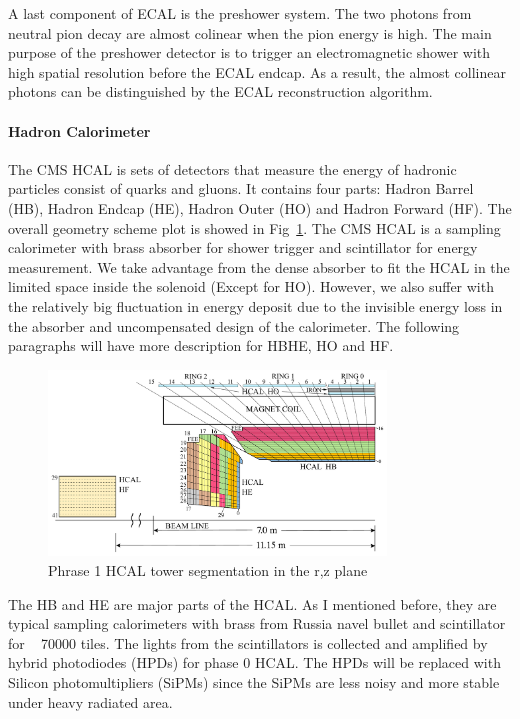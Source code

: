 A last component of ECAL is the preshower system. The two photons from neutral pion decay are almost colinear when the pion energy is high. The main purpose of the preshower detector is to trigger an electromagnetic shower with high spatial resolution before the ECAL endcap. As a result, the almost collinear photons can be distinguished by the ECAL reconstruction algorithm. 

\paragraph{Hadron Calorimeter}

The CMS HCAL is sets of detectors that measure the energy of hadronic particles consist of quarks and gluons. It contains four parts: Hadron Barrel (HB), Hadron Endcap (HE), Hadron Outer (HO) and Hadron Forward (HF). The overall geometry scheme plot is showed in Fig~\ref{fig:c3cms2dhcal}. The CMS HCAL is a sampling calorimeter with brass absorber for shower trigger and scintillator for energy measurement. We take advantage from the dense absorber to fit the HCAL in the limited space inside the solenoid (Except for HO). However, we also suffer with the relatively big fluctuation in energy deposit due to the invisible energy loss in the absorber and uncompensated design of the calorimeter. The following paragraphs will have more description for HBHE, HO and HF.

\begin{figure}[htbp]
 \begin{center}
  \includegraphics[width=0.8\textwidth]{figures/c3/c3_cms_2dhcal.pdf}
 \end{center}
 \caption{Phrase 1 HCAL tower segmentation in the r,z plane}
 \label{fig:c3cms2dhcal}
\end{figure}

The HB and HE are major parts of the HCAL. As I mentioned before, they are typical sampling calorimeters with brass from Russia navel bullet and scintillator for ~ 70000 tiles. The lights from the scintillators is collected and amplified by hybrid photodiodes (HPDs) for phase 0 HCAL. The HPDs will be replaced with Silicon photomultipliers (SiPMs) since the SiPMs are less noisy and more stable under heavy radiated area. 

